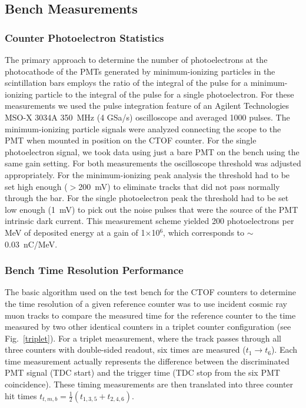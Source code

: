 \documentclass{elsart}
\begin{document}
\subsection{Bench Measurements}
\label{sec:bench}

\subsubsection{Counter Photoelectron Statistics}
\label{sec:npe}

The primary approach to determine the number of photoelectrons at the photocathode of the PMTs
generated by minimum-ionizing particles in the scintillation bars employs the ratio of the integral of the
pulse for a minimum-ionizing particle to the integral of the pulse for a single photoelectron. For these
measurements we used the pulse integration feature of an Agilent Technologies~\cite{agilent-ref}
MSO-X 3034A 350~MHz (4 GSa/s) oscilloscope and averaged 1000 pulses. The minimum-ionizing particle
signals were analyzed connecting the scope to the PMT when mounted in position on the CTOF counter. For
the single photoelectron signal, we took data using just a bare PMT on the bench using the same gain setting.
For both measurements the oscilloscope threshold was adjusted appropriately. For the minimum-ionizing
peak analysis the threshold had to be set high enough ($>$200~mV) to eliminate tracks that did not pass
normally through the bar. For the single photoelectron peak the threshold had to be set low enough (1~mV)
to pick out the noise pulses that were the source of the PMT intrinsic dark current. This measurement
scheme yielded 200 photoelectrons per MeV of deposited energy at a gain of 1$\times$10$^6$, which
corresponds to $\sim$0.03~nC/MeV.

\subsubsection{Bench Time Resolution Performance}
\label{sec-bench}

The basic algorithm used on the test bench for the CTOF counters to determine the time resolution of
a given reference counter was to use incident cosmic ray muon tracks to compare the measured time
for the reference counter to the time measured by two other identical counters in a triplet counter
configuration (see Fig.~\ref{triplet}). For a triplet measurement, where the track passes through all
three counters with double-sided readout, six times are measured ($t_1 \to t_6$). Each time measurement
actually represents the difference between the discriminated PMT signal (TDC start) and the trigger time
(TDC stop from the six PMT coincidence). These timing measurements are then translated into three counter
hit times $t_{t,m,b} = \frac{1}{2}(t_{1,3,5} + t_{2,4,6})$.
\end{document}
